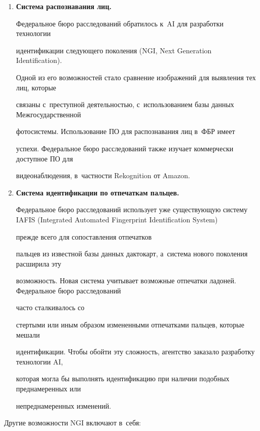   \begin{enumerate}[1.]


\item %


\textbf{Система распознавания лиц.}


Федеральное бюро расследований обратилось к~AI для разработки технологии 


идентификации следующего поколения (NGI, Next Generation Identification).


%


Одной из его возможностей стало сравнение изображений для выявления тех лиц, которые


связаны с~пре\-ступ\-ной дея\-тель\-ностью, с~использованием базы данных Межгосударственной


фотосистемы. Использование ПО для распознавания лиц в~ФБР имеет


успехи. Федеральное бюро расследований также изучает коммерчески доступное ПО для


видеонаблюдения, в~частности Rekognition от Amazon.


\item %


\textbf{Система идентификации по отпечаткам пальцев.}


Федеральное бюро расследований использует уже существующую систему IAFIS (Integrated Automated Fingerprint Identification System) 


прежде всего для сопоставления отпечатков


пальцев из известной базы данных дактокарт, а~сис\-те\-ма нового поколения расширила эту


возможность. Новая система учитывает возможные отпечатки ладоней. Федеральное бюро расследований


 часто сталкивалось со


стертыми или иным образом измененными отпечатками пальцев, которые мешали


идентификации. Чтобы обойти эту сложность, агентство заказало разработку технологии AI,


которая могла бы выполнять идентификацию при наличии подобных преднамеренных или


непреднамеренных изменений.


  \end{enumerate}





  Другие возможности NGI включают в~себя:


